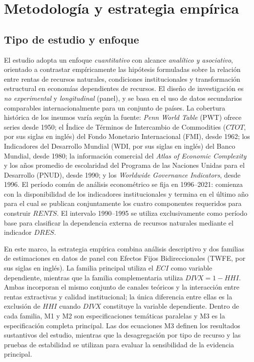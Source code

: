 \documentclass[../../TFM.tex]{subfiles}
\begin{document}


	\chapter{Metodología y estrategia empírica}
	\label{chap:metodologia}


	\section{Tipo de estudio y enfoque}
	\label{sec:tipo-de-estudio}

	El estudio adopta un enfoque \emph{cuantitativo} con alcance
	\emph{analítico y asociativo}, orientado a contrastar empíricamente las hipótesis
	formuladas sobre la relación entre rentas de recursos naturales,
	condiciones institucionales y transformación estructural en economías
	dependientes de recursos. El diseño de investigación es
	\emph{no experimental} y \emph{longitudinal} (panel), y se basa en el
	uso de datos secundarios comparables internacionalmente para un conjunto
	de países. La cobertura histórica de los insumos varía según la fuente:
	\textit{Penn World Table} (PWT) ofrece series desde 1950; el Índice de Términos de
	Intercambio de Commodities ($CTOT$, por sus siglas en inglés) del Fondo
	Monetario Internacional (FMI), desde 1962; los Indicadores del Desarrollo Mundial
	(WDI, por sus siglas en inglés) del Banco Mundial, desde 1980; la información comercial del
	\textit{Atlas of Economic Complexity} y los años promedio de escolaridad
	del Programa de las Naciones Unidas para el Desarrollo (PNUD), desde 1990; y los
	\textit{Worldwide Governance Indicators}, desde 1996. El período común de
	análisis econométrico se fija en 1996--2021: comienza con la disponibilidad
	de los indicadores institucionales y termina en el último año para el cual
	se publican conjuntamente los cuatro componentes requeridos para construir
	$RENTS$. El intervalo 1990--1995 se utiliza exclusivamente como período base
	para clasificar la dependencia externa de recursos naturales mediante el
	indicador $DRES$.

	En este marco, la estrategia empírica combina análisis descriptivo y dos
	familias de estimaciones en datos de panel con Efectos Fijos Bidireccionales
	(TWFE, por sus siglas en inglés).
	La familia principal utiliza el $ECI$ como
	variable dependiente, mientras que la familia complementaria utiliza
	$DIVX=1-HHI$. Ambas incorporan el mismo conjunto de canales teóricos y la
	interacción entre rentas extractivas y calidad institucional; la única
	diferencia entre ellas es la exclusión de $HHI$ cuando $DIVX$ constituye la
	variable dependiente. Dentro de cada familia, M1 y M2 son especificaciones
	temáticas paralelas y M3 es la especificación completa principal. Las dos
	ecuaciones M3 definen los resultados sustantivos del estudio, mientras que la
	desagregación por tipo de recurso y las pruebas de estabilidad se utilizan para
	evaluar la sensibilidad de la evidencia principal.
\end{document}
